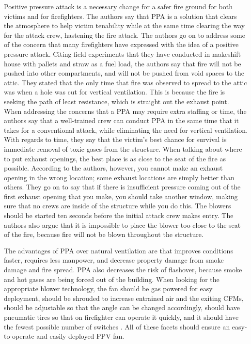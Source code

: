 \documentclass{article}
\begin{document}
\begin{appendices}
Positive pressure attack is a necessary change for a safer fire ground for both victims and for firefighters. The authors say that PPA is a solution that clears the atmosphere to help victim tenability while at the same time clearing the way for the attack crew, hastening the fire attack. The authors go on to address some of the concern that many firefighters have expressed with the idea of a positive pressure attack. Citing field experiments that they have conducted in makeshift house with pallets and straw as a fuel load, the authors say that fire will not be pushed into other compartments, and will not be pushed from void spaces to the attic. They stated that the only time that fire was observed to spread to the attic was when a hole was cut for vertical ventilation. This is because the fire is seeking the path of least resistance, which is straight out the exhaust point. When addressing the concerns that a PPA may require extra staffing or time, the authors say that a well-trained crew can conduct PPA in the same time that it takes for a conventional attack, while eliminating the need for vertical ventilation. With regards to time, they say that the victim’s best chance for survival is immediate removal of toxic gases from the structure. When talking about where to put exhaust openings, the best place is as close to the seat of the fire as possible. According to the authors, however, you cannot make an exhaust opening in the wrong location; some exhaust locations are simply better than others. They go on to say that if there is insufficient pressure coming out of the first exhaust opening that you make, you should take another window, making sure that no crews are inside of the structure while you do this. The blowers should be started ten seconds before the initial attack crew makes entry. The authors also argue that it is impossible to place the blower too close to the seat of the fire, because fire will not be blown throughout the structure.\cite{PositiveReinforcement}

The advantages of PPA over natural ventilation are that improves conditions faster, requires less manpower, and decrease property damage from smoke damage and fire spread. PPA also decreases the risk of flashover, because smoke and hot gases are being forced out of the building. When looking for the appropriate blower technology, the fan should be gas powered for easy deployment, should be shrouded to increase entrained air and the exiting CFMs, should be adjustable so that the angle can be changed accordingly, should have pneumatic tires so that on firefighter can operate it quickly, and it should have the fewest possible number of switches . All of these facets should ensure an easy-to-operate and easily deployed PPV fan.\cite{powerofPPV}


\end{appendices}
\end{document}
